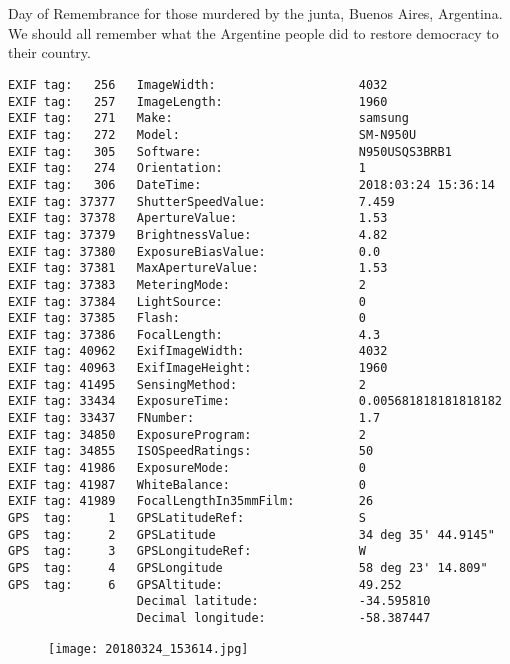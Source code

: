 \section{\protect{}}
\noindent Day of Remembrance for those murdered by the junta, Buenos Aires, Argentina. We should all remember what the Argentine people did to restore democracy to their country.
\noindent
\begin{lstlisting}
EXIF tag:   256   ImageWidth:                    4032
EXIF tag:   257   ImageLength:                   1960
EXIF tag:   271   Make:                          samsung
EXIF tag:   272   Model:                         SM-N950U
EXIF tag:   305   Software:                      N950USQS3BRB1
EXIF tag:   274   Orientation:                   1
EXIF tag:   306   DateTime:                      2018:03:24 15:36:14
EXIF tag: 37377   ShutterSpeedValue:             7.459
EXIF tag: 37378   ApertureValue:                 1.53
EXIF tag: 37379   BrightnessValue:               4.82
EXIF tag: 37380   ExposureBiasValue:             0.0
EXIF tag: 37381   MaxApertureValue:              1.53
EXIF tag: 37383   MeteringMode:                  2
EXIF tag: 37384   LightSource:                   0
EXIF tag: 37385   Flash:                         0
EXIF tag: 37386   FocalLength:                   4.3
EXIF tag: 40962   ExifImageWidth:                4032
EXIF tag: 40963   ExifImageHeight:               1960
EXIF tag: 41495   SensingMethod:                 2
EXIF tag: 33434   ExposureTime:                  0.005681818181818182
EXIF tag: 33437   FNumber:                       1.7
EXIF tag: 34850   ExposureProgram:               2
EXIF tag: 34855   ISOSpeedRatings:               50
EXIF tag: 41986   ExposureMode:                  0
EXIF tag: 41987   WhiteBalance:                  0
EXIF tag: 41989   FocalLengthIn35mmFilm:         26
GPS  tag:     1   GPSLatitudeRef:                S
GPS  tag:     2   GPSLatitude                    34 deg 35' 44.9145"
GPS  tag:     3   GPSLongitudeRef:               W
GPS  tag:     4   GPSLongitude                   58 deg 23' 14.809"
GPS  tag:     6   GPSAltitude:                   49.252
                  Decimal latitude:              -34.595810
                  Decimal longitude:             -58.387447

\end{lstlisting}
\clearpage
\begin{figure}
\raggedleft
\texttt{[image: 20180324\_153614.jpg]}
\end{figure}



